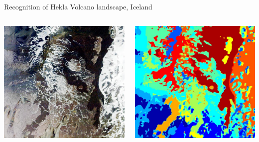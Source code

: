 \documentclass[pressentation,9pt,aspectratio=1610,xcolor=table]{beamer}
\begin{document}
\begin{frame}{Recognition of Hekla Volcano landscape, Iceland}

  \begin{columns}
    \begin{column}{0.45\columnwidth}
      \begin{center}
        \includegraphics[width=.8\linewidth]{hekla_original.jpg}
      \end{center}
    \end{column}
    \begin{column}{0.45\columnwidth}
      \begin{center}
        \includegraphics[width=.8\linewidth]{hekla_classif.jpg}
      \end{center}
    \end{column}
  \end{columns}
  

\end{frame}
\end{document}

